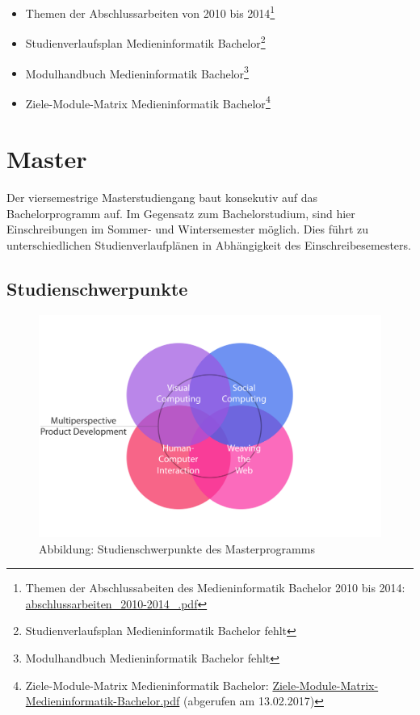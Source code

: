 \begin{itemize}
\tightlist
\item
  Themen der Abschlussarbeiten von 2010 bis 2014\footnote{Themen der
    Abschlussabeiten des Medieninformatik Bachelor 2010 bis 2014:
    \href{../anhaenge/abschlussarbeiten_2010-2014_.pdf}{abschlussarbeiten\_2010-2014\_.pdf}}
\item
  Studienverlaufsplan Medieninformatik Bachelor\footnote{Studienverlaufsplan
    Medieninformatik Bachelor fehlt}
\item
  Modulhandbuch Medieninformatik Bachelor\footnote{Modulhandbuch
    Medieninformatik Bachelor fehlt}
\item
  Ziele-Module-Matrix Medieninformatik Bachelor\footnote{Ziele-Module-Matrix
    Medieninformatik Bachelor:
    \href{../anhaenge/Ziele-Module-Matrix-Medieninformatik-Bachelor.pdf}{Ziele-Module-Matrix-Medieninformatik-Bachelor.pdf}
    (abgerufen am 13.02.2017)}
\end{itemize}

\section{Master}\label{master}

Der viersemestrige Masterstudiengang baut konsekutiv auf das
Bachelorprogramm auf. Im Gegensatz zum Bachelorstudium, sind hier
Einschreibungen im Sommer- und Wintersemester möglich. Dies führt zu
unterschiedlichen Studienverlaufplänen in Abhängigkeit des
Einschreibesemesters.

\subsection{Studienschwerpunkte}\label{studienschwerpunkte}

\begin{figure}[htbp][htbp]
\centering
\includegraphics[width=\columnwidth]{../anhaenge/bilder/ma-schwerpunkte.png}
\caption{Abbildung: Studienschwerpunkte des Masterprogramms}
\end{figure}

